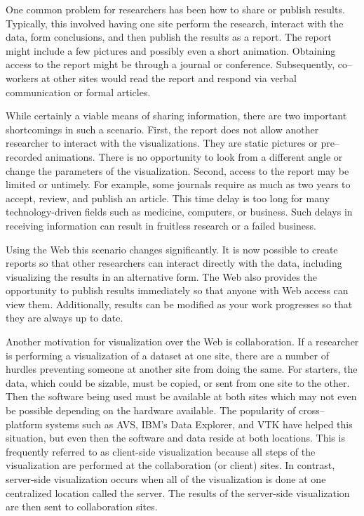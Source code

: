 One common problem for researchers has been how to share or publish results. Typically, this involved having one site perform the research, interact with the data, form conclusions, and then publish the results as a report. The report might include a few pictures and possibly even a short animation. Obtaining access to the report might be through a journal or conference. Subsequently, co--workers at other sites would read the report and respond via verbal communication or formal articles.

While certainly a viable means of sharing information, there are two important shortcomings in such a scenario. First, the report does not allow another researcher to interact with the visualizations. They are static pictures or pre--recorded animations. There is no opportunity to look from a different angle or change the parameters of the visualization. Second, access to the report may be limited or untimely. For example, some journals require as much as two years to accept, review, and publish an article. This time delay is too long for many technology-driven fields such as medicine, computers, or business. Such delays in receiving information can result in fruitless research or a failed business.

Using the Web this scenario changes significantly. It is now possible to create reports so that other researchers can interact directly with the data, including visualizing the results in an alternative form. The Web also provides the opportunity to publish results immediately so that anyone with Web access can view them. Additionally, results can be modified as your work progresses so that they are always up to date.

Another motivation for visualization over the Web is collaboration. If a researcher is performing a visualization of a dataset at one site, there are a number of hurdles preventing someone at another site from doing the same. For starters, the data, which could be sizable, must be copied, or sent from one site to the other. Then the software being used must be available at both sites which may not even be possible depending on the hardware available. The popularity of cross--platform systems such as AVS, IBM's Data Explorer, and VTK have helped this situation, but even then the software and data reside at both locations. This is frequently referred to as client-side visualization because all steps of the visualization are performed at the collaboration (or client) sites. In contrast, server-side visualization occurs when all of the visualization is done at one centralized location called the server. The results of the server-side visualization are then sent to collaboration sites.

